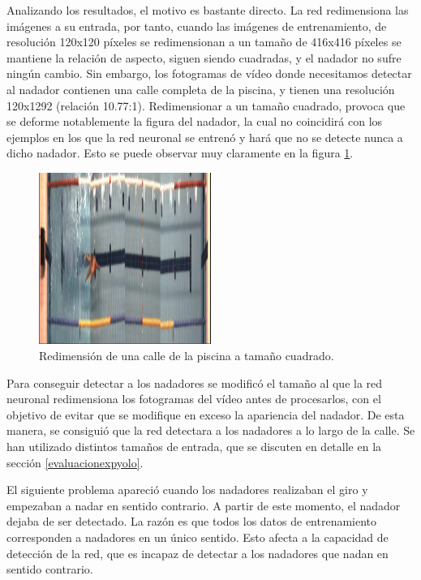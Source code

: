 Analizando los resultados, el motivo es bastante directo. La red redimensiona las imágenes a su entrada, por tanto, cuando las imágenes de entrenamiento, de resolución 120x120 píxeles se redimensionan a un tamaño de 416x416 píxeles se mantiene la relación de aspecto, siguen siendo cuadradas, y el nadador no sufre ningún cambio. Sin embargo, los fotogramas de vídeo donde necesitamos detectar al nadador contienen una calle completa de la piscina, y tienen una resolución 120x1292 (relación 10.77:1). Redimensionar a un tamaño cuadrado, provoca que se deforme notablemente la figura del nadador, la cual no coincidirá con los ejemplos en los que la red neuronal se entrenó y hará que no se detecte nunca a dicho nadador. Esto se puede observar muy claramente en la figura \ref{fig:ejemplomalredimension}.

\begin{figure}
    \centering
    \includegraphics[width=0.5\textwidth,height=0.5\textheight,keepaspectratio]{imagenes/parte_IA/416x416_YOLO_resize.png}
    \caption{Redimensión de una calle de la piscina a tamaño cuadrado.}
    \label{fig:ejemplomalredimension}
\end{figure}

Para conseguir detectar a los nadadores se modificó el tamaño al que la red neuronal redimensiona los fotogramas del vídeo antes de procesarlos, con el objetivo de evitar que se modifique en exceso la apariencia del nadador. De esta manera, se consiguió que la red detectara a los nadadores a lo largo de la calle. Se han utilizado distintos tamaños de entrada, que se discuten en detalle en la sección \ref{evaluacionexpyolo}.

El siguiente problema apareció cuando los nadadores realizaban el giro y empezaban a nadar en sentido contrario. A partir de este momento, el nadador dejaba de ser detectado. La razón es que todos los datos de entrenamiento corresponden a nadadores en un único sentido. Esto afecta a la capacidad de detección de la red, que es incapaz de detectar a los nadadores que nadan en sentido contrario. 

